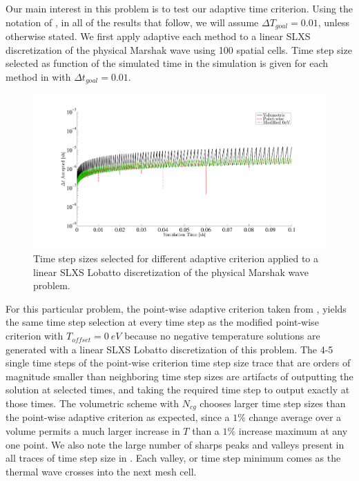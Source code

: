 Our main interest in this problem is to test our adaptive time criterion.  
Using the notation of , in all of the results that follow, we will assume $\Delta T_{goal} = 0.01$, unless otherwise stated.
We first apply adaptive each method to a linear SLXS discretization of the physical Marshak wave using 100 spatial cells.
Time step size selected as function of the simulated time in the simulation is given for each method in  with $\Delta t_{goal} =0.01$.
\begin{figure}[!htp]
\centering
\includegraphics[width=17cm,trim=2in  0.4in 0.5in 0.75in,clip=true]{chapter6_grey_radtran/Dissertation_Data/P1_vs_time.pdf}
\caption{Time step sizes selected for different adaptive criterion applied to a linear SLXS Lobatto discretization of the physical Marshak wave problem.}
\label{fig:linear_time_steps}
\end{figure}
For this particular problem, the point-wise adaptive criterion taken from \cite{time_adaptive_diffusion}, yields the same time step selection at every time step as the modified point-wise criterion with $T_{offset}=0~eV$ because no negative temperature solutions are generated with a linear SLXS Lobatto discretization of this problem.
The 4-5 single time steps of the point-wise criterion time step size trace that are orders of magnitude smaller than neighboring time step sizes are artifacts of outputting the solution at selected times, and taking the required time step to output exactly at those times.
The volumetric scheme with $N_{cg}$ chooses larger time step sizes than the point-wise adaptive criterion as expected, since a $1\%$ change average over a volume permits a much larger increase in $T$ than a $1\%$ increase maximum at any one point.
We also note the large number of sharps peaks and valleys present in all traces of time step size in .  Each valley, or time step minimum comes as the thermal wave crosses into the next mesh cell.
